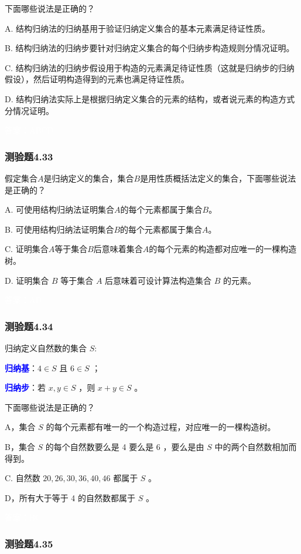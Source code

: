 \documentclass[UTF8, heading=true]{ctexart}
\begin{document}
下面哪些说法是正确的？

A. 
结构归纳法的归纳基用于验证归纳定义集合的基本元素满足待证性质。

B. 
结构归纳法的归纳步要针对归纳定义集合的每个归纳步构造规则分情况证明。

C. 
结构归纳法的归纳步假设用于构造的元素满足待证性质（这就是归纳步的归纳假设），然后证明构造得到的元素也满足待证性质。

D.  
结构归纳法实际上是根据归纳定义集合的元素的结构，或者说元素的构造方式分情况证明。

\textcolor{white}{答案：ABCD}

\subsubsection{测验题4.33}

假定集合$A$是归纳定义的集合，集合$B$是用性质概括法定义的集合，下面哪些说法是正确的？

A. 
可使用结构归纳法证明集合$A$的每个元素都属于集合$B$。

B. 
可使用结构归纳法证明集合$B$的每个元素都属于集合$A$。

C. 
证明集合$A$等于集合$B$后意味着集合$A$的每个元素的构造都对应唯一的一棵构造树。

D.  
证明集合 $B$ 等于集合 $A$ 后意味着可设计算法构造集合 $B$ 的元素。

\textcolor{white}{答案：AD}

\subsubsection{测验题4.34}

归纳定义自然数的集合 $S:$ 

\textcolor{blue}{\textbf{归纳基}}：$4 \in S$ 且 $6 \in S$ ；

\textcolor{blue}{\textbf{归纳步}}：若 $x, y \in S$ ，则 $x+y \in S$ 。

下面哪些说法是正确的？

A，集合 $S$ 的每个元素都有唯一的一个构造过程，对应唯一的一棵构造树。

B，集合 $S$ 的每个自然数要么是 4 要么是 6 ，要么是由 $S$ 中的两个自然数相加而得到。

C. 自然数 $20,26,30,36,40,46$ 都属于 $S$ 。

D，所有大于等于 4 的自然数都属于 $S$ 。

\textcolor{white}{答案：BC}

\subsubsection{测验题4.35}
\end{document}
